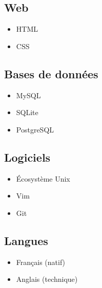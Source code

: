 \documentclass[a4paper]{article}
\begin{document}
\subsection*{Web}

\begin{itemize}
  \item HTML
  \item CSS
\end{itemize}

\subsection*{Bases de données}

\begin{itemize}
  \item MySQL
  \item SQLite
  \item PostgreSQL
\end{itemize}

\subsection*{Logiciels}

\begin{itemize}
  \item Écosystème Unix
  \item Vim
  \item Git
\end{itemize}

\subsection*{Langues}

\begin{itemize}
  \item Français (natif)
  \item Anglais (technique)
\end{itemize}
\end{document}
